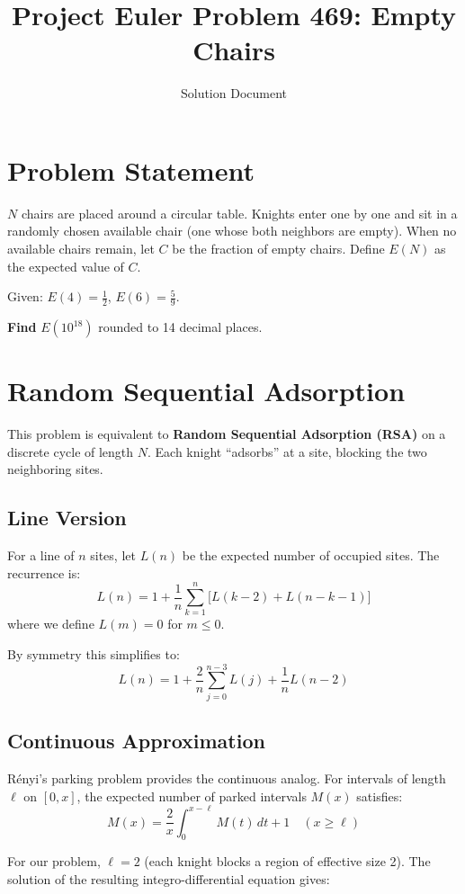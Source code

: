 \documentclass[11pt]{article}
\title{Project Euler Problem 469: Empty Chairs}
\author{Solution Document}
\date{}
\begin{document}
\maketitle

\section{Problem Statement}

$N$ chairs are placed around a circular table. Knights enter one by one and sit in a randomly chosen available chair (one whose both neighbors are empty). When no available chairs remain, let $C$ be the fraction of empty chairs. Define $E(N)$ as the expected value of $C$.

Given: $E(4) = \frac{1}{2}$, $E(6) = \frac{5}{9}$.

\textbf{Find} $E(10^{18})$ rounded to 14 decimal places.

\section{Random Sequential Adsorption}

This problem is equivalent to \textbf{Random Sequential Adsorption (RSA)} on a discrete cycle of length $N$. Each knight ``adsorbs'' at a site, blocking the two neighboring sites.

\subsection{Line Version}

For a line of $n$ sites, let $L(n)$ be the expected number of occupied sites. The recurrence is:
\[
L(n) = 1 + \frac{1}{n} \sum_{k=1}^{n} \bigl[L(k-2) + L(n-k-1)\bigr]
\]
where we define $L(m) = 0$ for $m \leq 0$.

By symmetry this simplifies to:
\[
L(n) = 1 + \frac{2}{n} \sum_{j=0}^{n-3} L(j) + \frac{1}{n} L(n-2)
\]

\subsection{Continuous Approximation}

R\'enyi's parking problem provides the continuous analog. For intervals of length $\ell$ on $[0, x]$, the expected number of parked intervals $M(x)$ satisfies:
\[
M(x) = \frac{2}{x} \int_0^{x-\ell} M(t)\,dt + 1 \quad (x \geq \ell)
\]

For our problem, $\ell = 2$ (each knight blocks a region of effective size 2). The solution of the resulting integro-differential equation gives:
\end{document}

